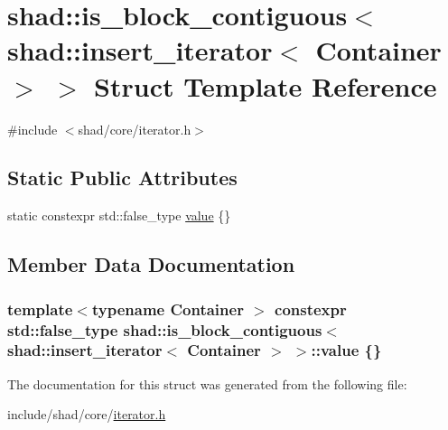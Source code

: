 \hypertarget{structshad_1_1is__block__contiguous_3_01shad_1_1insert__iterator_3_01Container_01_4_01_4}{\section{shad\-:\-:is\-\_\-block\-\_\-contiguous$<$ shad\-:\-:insert\-\_\-iterator$<$ Container $>$ $>$ Struct Template Reference}
\label{structshad_1_1is__block__contiguous_3_01shad_1_1insert__iterator_3_01Container_01_4_01_4}
}


{\ttfamily \#include $<$shad/core/iterator.\-h$>$}

\subsection*{Static Public Attributes}
\begin{DoxyCompactItemize}
\item 
static constexpr std\-::false\-\_\-type \hyperlink{structshad_1_1is__block__contiguous_3_01shad_1_1insert__iterator_3_01Container_01_4_01_4_ac1de637c6b8719fbfa91ae95d5c9dadd}{value} \{\}
\end{DoxyCompactItemize}


\subsection{Member Data Documentation}
\hypertarget{structshad_1_1is__block__contiguous_3_01shad_1_1insert__iterator_3_01Container_01_4_01_4_ac1de637c6b8719fbfa91ae95d5c9dadd}{
\subsubsection[{value}]{\setlength{\rightskip}{0pt plus 5cm}template$<$typename Container $>$ constexpr std\-::false\-\_\-type {\bf shad\-::is\-\_\-block\-\_\-contiguous}$<$ {\bf shad\-::insert\-\_\-iterator}$<$ Container $>$ $>$\-::value \{\}\hspace{0.3cm}{\ttfamily [static]}}}\label{structshad_1_1is__block__contiguous_3_01shad_1_1insert__iterator_3_01Container_01_4_01_4_ac1de637c6b8719fbfa91ae95d5c9dadd}


The documentation for this struct was generated from the following file\-:\begin{DoxyCompactItemize}
\item 
include/shad/core/\hyperlink{iterator_8h}{iterator.\-h}\end{DoxyCompactItemize}
